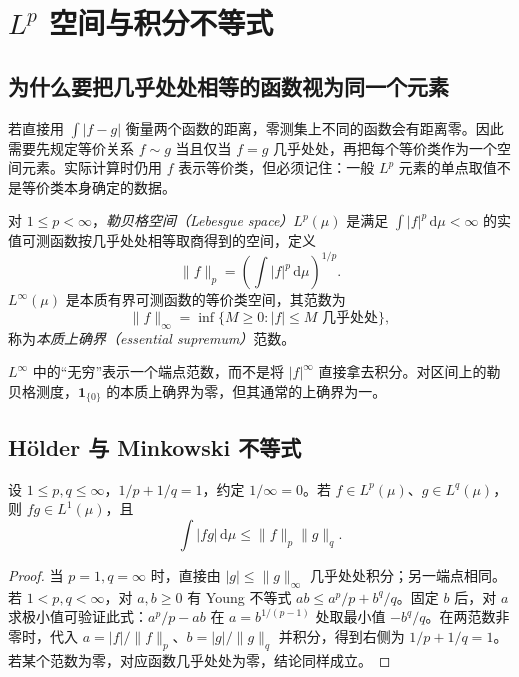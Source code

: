 \setcounter{chapter}{9} %
\chapter{$L^p$ 空间与积分不等式}
\label{chap:mt-lp}

\section{为什么要把几乎处处相等的函数视为同一个元素}
若直接用 $\int|f-g|$ 衡量两个函数的距离，零测集上不同的函数会有距离零。因此需要先规定等价关系 $f\sim g$ 当且仅当 $f=g$ 几乎处处，再把每个等价类作为一个空间元素。实际计算时仍用 $f$ 表示等价类，但必须记住：一般 $L^p$ 元素的单点取值不是等价类本身确定的数据。

\begin{definition}
对 $1\leq p<\infty$，\emph{勒贝格空间（Lebesgue space）}$L^p(\mu)$ 是满足 $\int|f|^p\,\mathrm d\mu<\infty$ 的实值可测函数按几乎处处相等取商得到的空间，定义
\[
 \|f\|_p=\left(\int|f|^p\,\mathrm d\mu\right)^{1/p}.
\]
$L^\infty(\mu)$ 是本质有界可测函数的等价类空间，其范数为
\[
 \|f\|_\infty=\inf\{M\geq0:|f|\leq M\text{ 几乎处处}\},
\]
称为\emph{本质上确界（essential supremum）}范数。
\end{definition}
$L^\infty$ 中的“无穷”表示一个端点范数，而不是将 $|f|^\infty$ 直接拿去积分。对区间上的勒贝格测度，$\mathbf1_{\{0\}}$ 的本质上确界为零，但其通常的上确界为一。

\section{Hölder 与 Minkowski 不等式}
\begin{theorem}
设 $1\leq p,q\leq\infty$，$1/p+1/q=1$，约定 $1/\infty=0$。若 $f\in L^p(\mu)$、$g\in L^q(\mu)$，则 $fg\in L^1(\mu)$，且
\begin{equation}
 \int|fg|\,\mathrm d\mu\leq\|f\|_p\|g\|_q.
 \label{eq:mt-holder}
\end{equation}
\end{theorem}
\begin{proof}
当 $p=1,q=\infty$ 时，直接由 $|g|\leq\|g\|_\infty$ 几乎处处积分；另一端点相同。若 $1<p,q<\infty$，对 $a,b\geq0$ 有 Young 不等式 $ab\leq a^p/p+b^q/q$。固定 $b$ 后，对 $a$ 求极小值可验证此式：$a^p/p-ab$ 在 $a=b^{1/(p-1)}$ 处取最小值 $-b^q/q$。在两范数非零时，代入 $a=|f|/\|f\|_p$、$b=|g|/\|g\|_q$ 并积分，得到右侧为 $1/p+1/q=1$。若某个范数为零，对应函数几乎处处为零，结论同样成立。
\end{proof}

